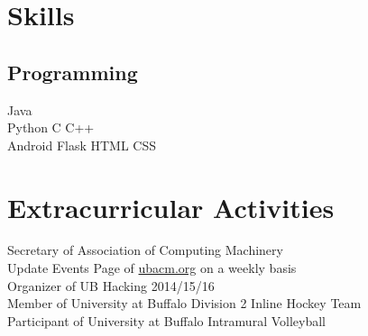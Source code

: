 \documentclass[letterpaper]{deedy-resume} %
\begin{document}
\begin{minipage}[t]{0.33\textwidth}
\section{Skills}

\subsection{Programming}

Java \\
Python \textbullet{} C \textbullet{} C++ \\
Android \textbullet{} Flask \textbullet{} HTML \textbullet{} CSS

\sectionspace %


\section{Extracurricular Activities} 

Secretary of Association of Computing Machinery \\
Update Events Page of \url{ubacm.org} on a weekly basis \\
Organizer of UB Hacking 2014/15/16 \\
Member of University at Buffalo Division 2 Inline Hockey Team \\
Participant of University at Buffalo Intramural Volleyball \\

\sectionspace %


\end{minipage} %
\hfill
%
%
\end{document}
